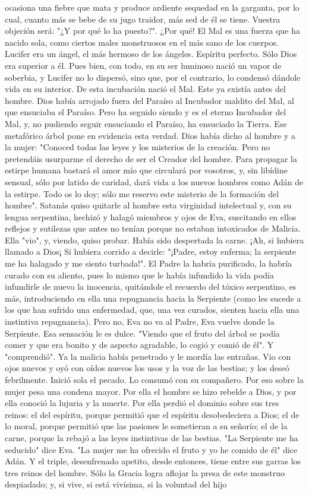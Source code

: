 \documentclass[12pt]{book} %
\begin{document}
ocasiona una fiebre que mata y produce ardiente sequedad en la garganta, por lo cual, cuanto más se bebe de su jugo traidor, más sed de él se tiene. Vuestra objeción será: "¿Y por qué lo ha puesto?". ¿Por qué! El Mal es una fuerza que ha nacido sola, como ciertos males monstruosos en el más sano de los cuerpos. Lucifer era un ángel, el más hermoso de los ángeles. Espíritu perfecto. Sólo Dios era superior a él. Pues bien, con todo, en su ser luminoso nació un vapor de soberbia, y Lucifer no lo dispersó, sino que, por el contrario, lo condensó dándole vida en su interior. De esta incubación nació el Mal. Este ya existía antes del hombre. Dios había arrojado fuera del Paraíso al Incubador maldito del Mal, al que ensuciaba el Paraíso. Pero ha seguido siendo y es el eterno Incubador del Mal, y, no pudiendo seguir ensuciando el Paraíso, ha ensuciado la Tierra. Ese metafórico árbol pone en evidencia esta verdad. Dios había dicho al hombre y a la mujer: "Conoced todas las leyes y los misterios de la creación. Pero no pretendáis usurparme el derecho de ser el Creador del hombre. Para propagar la estirpe humana bastará el amor mío que circulará por vosotros, y, sin libídine sensual, sólo por latido de caridad, dará vida a los nuevos hombres como Adán de la estirpe. Todo os lo doy; sólo me reservo este misterio de la formación del hombre". Satanás quiso quitarle al hombre esta virginidad intelectual y, con su lengua serpentina, hechizó y halagó miembros y ojos de Eva, suscitando en ellos reflejos y sutilezas que antes no tenían porque no estaban intoxicados de Malicia. Ella "vio", y, viendo, quiso probar. Había sido despertada la carne. ¡Ah, si hubiera llamado a Dios¡ Si hubiera corrido a decirle: "¡Padre, estoy enferma; la serpiente me ha halagado y me siento turbada!". El Padre la habría purificado, la habría curado con su aliento, pues lo mismo que le había infundido la vida podía infundirle de nuevo la inocencia, quitándole el recuerdo del tóxico serpentino, es más, introduciendo en ella una repugnancia hacia la Serpiente (como les sucede a los que han sufrido una enfermedad, que, una vez curados, sienten hacia ella una instintiva repugnancia). Pero no, Eva no va al Padre, Eva vuelve donde la Serpiente. Esa sensación le es dulce. "Viendo que el fruto del árbol se podía comer y que era bonito y de aspecto agradable, lo cogió y comió de él". Y "comprendió". Ya la malicia había penetrado y le mordía las entrañas. Vio con ojos nuevos y oyó con oídos nuevos los usos y la voz de las bestias; y los deseó febrilmente. Inició sola el pecado. Lo consumó con su compañero. Por eso sobre la mujer pesa una condena mayor. Por ella el hombre se hizo rebelde a Dios, y por ella conoció la lujuria y la muerte. Por ella perdió el dominio sobre sus tres reinos: el del espíritu, porque permitió que el espíritu desobedeciera a Dios; el de lo moral, porque permitió que las pasiones le sometieran a su señorío; el de la carne, porque la rebajó a las leyes instintivas de las bestias. "La Serpiente me ha seducido" dice Eva. "La mujer me ha ofrecido el fruto y yo he comido de él" dice Adán. Y el triple, desenfrenado apetito, desde entonces, tiene entre sus garras los tres reinos del hombre. Sólo la Gracia logra aflojar la presa de este monstruo despiadado; y, si vive, si está vivísima, si la voluntad del hijo 
\end{document}
